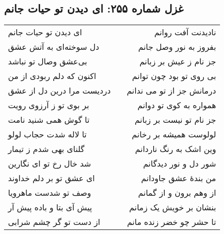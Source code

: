 \begin{center}
\section*{غزل شماره ۲۵۵: ای دیدن تو حیات جانم}
\label{sec:255}
\begin{longtable}{l p{0.5cm} r}
ای دیدن تو حیات جانم
&&
نادیدنت آفت روانم
\\
دل سوخته‌ای به آتش عشق
&&
بفروز به نور وصل جانم
\\
بی‌عشق وصال تو نباشد
&&
جز نام ز عیش بر زبانم
\\
اکنون که دلم ربودی از من
&&
بی روی تو بود چون توانم
\\
دردیست مرا درین دل از عشق
&&
درمانش جز از تو می ندانم
\\
بر بوی تو ز آرزوی رویت
&&
همواره به کوی تو دوانم
\\
تا گوش همی شنید نامت
&&
جز نام تو نیست بر زبانم
\\
تا لاله شدت حجاب لولو
&&
لولوست همیشه بر رخانم
\\
گلنای بهی شدم ز تیمار
&&
وین اشک به رنگ ناردانم
\\
شد خال رخ تو ای نگارین
&&
شور دل و نور دیدگانم
\\
ای عشق تو بر دلم خداوند
&&
من بندهٔ عشق جاودانم
\\
وصف تو شدست ماهرویا
&&
از وهم برون و از گمانم
\\
پیش آی بتا و باده پیش آر
&&
بنشان بر خویش یک زمانم
\\
از دست تو گر چشم شرابی
&&
تا حشر چو خضر زنده مانم
\\
\end{longtable}
\end{center}
